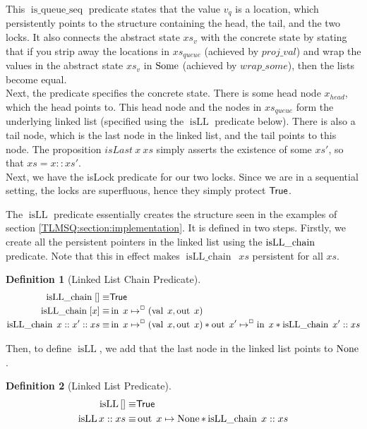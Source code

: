 \documentclass[a4paper, 11pt]{report}
\newtheorem{definition}{Definition}[section]
\newcommand{\isqueueseq}{\operatorname{is\_queue\_seq}}
\newcommand{\isLLchain}[1]{\operatorname{isLL\_chain} \; #1}
\newcommand{\isLL}{\operatorname{isLL}}
\newcommand{\nIn}[1]{\operatorname{in} \; #1}
\newcommand{\nVal}[1]{\operatorname{val} \; #1}
\newcommand{\nOut}[1]{\operatorname{out} \; #1}
\begin{document}
This $\isqueueseq$ predicate states that the value $v_q$ is a location, which persistently points to the structure containing the head, the tail, and the two locks. It also connects the abstract state $xs_v$ with the concrete state by stating that if you strip away the locations in $xs_{queue}$ (achieved by $proj\_val$) and wrap the values in the abstract state $xs_v$ in $\operatorname{Some}$ (achieved by $wrap\_some$), then the lists become equal.\\
Next, the predicate specifies the concrete state. There is some head node $x_{head}$, which the head points to. This head node and the nodes in $xs_{queue}$ form the underlying linked list (specified using the $\isLL$ predicate below). There is also a tail node, which is the last node in the linked list, and the tail points to this node. The proposition $isLast\ x\ xs$ simply asserts the existence of some $xs'$, so that $xs = x :: xs'$.\\
Next, we have the isLock predicate for our two locks. Since we are in a sequential setting, the locks are superfluous, hence they simply protect $\textsf{True}$.

The $\isLL$ predicate essentially creates the structure seen in the examples of section \ref{TLMSQ:section:implementation}. It is defined in two steps. Firstly, we create all the persistent pointers in the linked list using the $\isLLchain$ predicate. Note that this in effect makes $\isLLchain \ xs$ persistent for all $xs$.
\begin{definition}[Linked List Chain Predicate]
  \begin{align*}
    \isLLchain{[]} \equiv& \TRUE\\
    \isLLchain{[x]} \equiv& \nIn{x} \mapsto^{\persistently} (\nVal{x}, \nOut{x})\\
    \isLLchain{x :: x' :: xs} \equiv& \nIn{x} \mapsto^{\persistently} (\nVal{x}, \nOut{x}) \star \nOut{x'} \mapsto^{\persistently} \nIn{x} \star \isLLchain{x' :: xs}
  \end{align*}
\end{definition}

Then, to define $\isLL$, we add that the last node in the linked list points to $\operatorname{None}$.
\begin{definition}[Linked List Predicate]
  \begin{align*}
    \isLL{[]} \equiv& \TRUE\\
    \isLL{x :: xs} \equiv& \nOut{x} \mapsto \None \star \isLLchain{x :: xs}
  \end{align*}
\end{definition}
\end{document}
